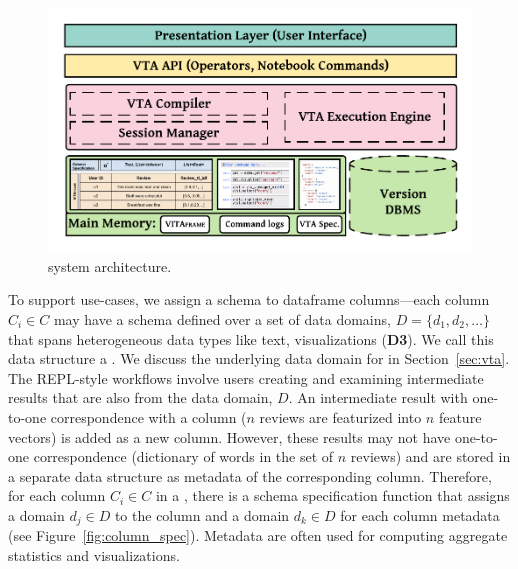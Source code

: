 \begin{figure}[tbp] 
  \centering
  \includegraphics[width=\linewidth,trim={0 15 0 10},clip]{figures/vita.pdf}
  \caption{\small \system system architecture.\label{fig:arch}}
 \vspace{-15pt}
\end{figure}
To support \vita use-cases,  we assign a schema to dataframe columns---each column $C_i \in C$ may have a schema defined over a set of data domains, $D = \{d_1, d_2, \ldots\}$ that spans heterogeneous data types like text, visualizations (\textbf{D3}). We call this data structure a \vitaframe. We discuss the underlying data domain for \vita in Section~\ref{sec:vta}.
The REPL-style \vita workflows involve users creating and examining intermediate results that are also from the data domain, $D$. An intermediate result with one-to-one correspondence with a \vitaframe column
(\eg $n$ reviews are featurized into $n$ feature vectors) is added as a new column. However, these results may not have one-to-one correspondence (\eg dictionary of words in the set of $n$ reviews) and are stored in a separate data structure as metadata of the corresponding column.
Therefore, for each column $C_i \in C$ in a \vitaframe, there is a schema specification function that assigns a domain $d_j \in D$ to the column and a domain $d_k \in D$ for each column metadata (see Figure~\ref{fig:column_spec}).
Metadata are often used for computing aggregate statistics and visualizations.



